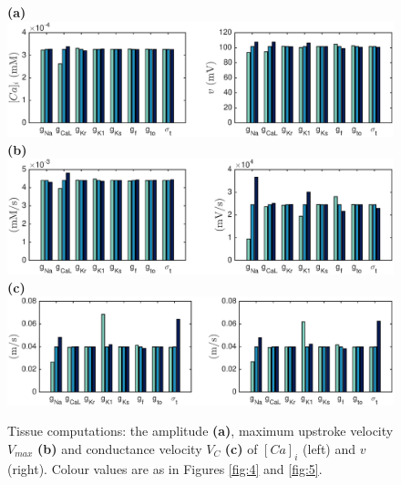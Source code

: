 \documentclass[12pt,a4paper]{article}
\begin{document}
\begin{figure}
 \textbf{(a)}  \includegraphics[trim=1cm 0cm 2cm 0cm, clip=true, width=1\linewidth]{amplitude} 
 \textbf{(b)}  \includegraphics[trim=1cm 0cm 2cm 0cm, clip=true, width=1\linewidth]{v_max} 
 \textbf{(c)}   \includegraphics[trim=1cm 0cm 2cm 0cm, clip=true, width=1\linewidth]{v_c} 
    \caption{Tissue computations: the amplitude \textbf{(a)}, maximum upstroke velocity $V_{max}$ \textbf{(b)} and conductance velocity $V_{C}$ \textbf{(c)} of $[Ca]_i$ (left) and $v$ (right).  Colour values are as in Figures \ref{fig:4} and \ref{fig:5}.}
    \label{fig:6}
\end{figure}
%
\end{document}
